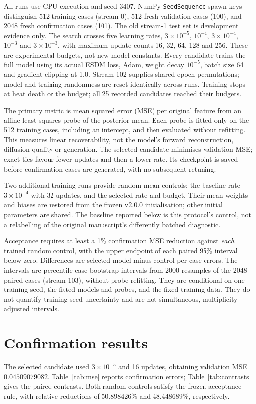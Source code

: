 \documentclass[11pt,a4paper]{article}
\begin{document}
All runs use CPU execution and seed 3407. NumPy
\texttt{SeedSequence} spawn keys distinguish 512 training cases (stream 0),
512 fresh validation cases (100), and 2048 fresh confirmation cases (101).
The old stream-1 test set is development evidence only. The search crosses
five learning rates, $3\times10^{-5}$, $10^{-4}$, $3\times10^{-4}$,
$10^{-3}$ and $3\times10^{-3}$, with maximum update counts
16, 32, 64, 128 and 256. These are experimental budgets, not new model
constants. Every candidate trains the full model using its actual ESDM
loss, Adam, weight decay $10^{-5}$, batch size 64 and gradient clipping
at 1.0. Stream 102 supplies shared epoch permutations; model and training
randomness are reset identically across runs. Training stops at heat death
or the budget; all 25 recorded candidates reached their budgets.

The primary metric is mean squared error (MSE) per original feature from
an affine least-squares probe of the posterior mean. Each probe is fitted
only on the 512 training cases, including an intercept, and then evaluated
without refitting. This measures linear recoverability, not the model's
forward reconstruction, diffusion quality or generation. The selected
candidate minimises validation MSE; exact ties favour fewer updates and
then a lower rate. Its checkpoint is saved before confirmation cases are
generated, with no subsequent retuning.

Two additional training runs provide random-mean controls: the baseline
rate $3\times10^{-4}$ with 32 updates, and the selected rate and budget.
Their mean weights and biases are restored from the frozen v2.0.0
initialisation; other initial parameters are shared. The baseline reported
below is this protocol's control, not a relabelling of the original
manuscript's differently batched diagnostic.

Acceptance requires at least a 1\% confirmation MSE reduction against
\emph{each} trained random control, with the upper endpoint of each paired
95\% interval below zero. Differences are selected-model minus control
per-case errors. The intervals are percentile case-bootstrap intervals
from 2000 resamples of the 2048 paired cases (stream 103), without probe
refitting. They are conditional on one training seed, the fitted models
and probes, and the fixed training data. They do not quantify training-seed
uncertainty and are not simultaneous, multiplicity-adjusted intervals.

\section{Confirmation results}
The selected candidate used $3\times10^{-5}$ and 16 updates, obtaining
validation MSE $0.04509079082$. Table~\ref{tab:mse} reports confirmation
errors; Table~\ref{tab:contrasts} gives the paired contrasts. Both random
controls satisfy the frozen acceptance rule, with relative reductions of
50.898426\% and 48.448689\%, respectively.
\end{document}
